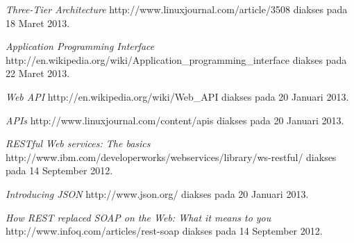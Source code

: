 \documentclass[a4paper, 12pt]{report}
\begin{document}
\begin{thebibliography}{99}
  \emph{Three-Tier Architecture}
  http://www.linuxjournal.com/article/3508
  diakses pada 18 Maret 2013.
  
  \emph{Application Programming Interface}
  http://en.wikipedia.org/wiki/Application\_programming\_interface
  diakses pada 22 Maret 2013.
  
  \emph{Web API}
  http://en.wikipedia.org/wiki/Web\_API
  diakses pada 20 Januari 2013.
  
  \emph{APIs}
  http://www.linuxjournal.com/content/apis
  diakses pada 20 Januari 2013.

  \emph{RESTful Web services: The basics}
  \\http://www.ibm.com/developerworks/webservices/library/ws-restful/
  diakses pada 14 September 2012.

  \emph{Introducing JSON} http://www.json.org/
  diakses pada 20 Januari 2013.
    
  \emph{How REST replaced SOAP on the Web: What it means to you}
  http://www.infoq.com/articles/rest-soap
  diakses pada 14 September 2012.
 
\end{thebibliography}
\end{document}
